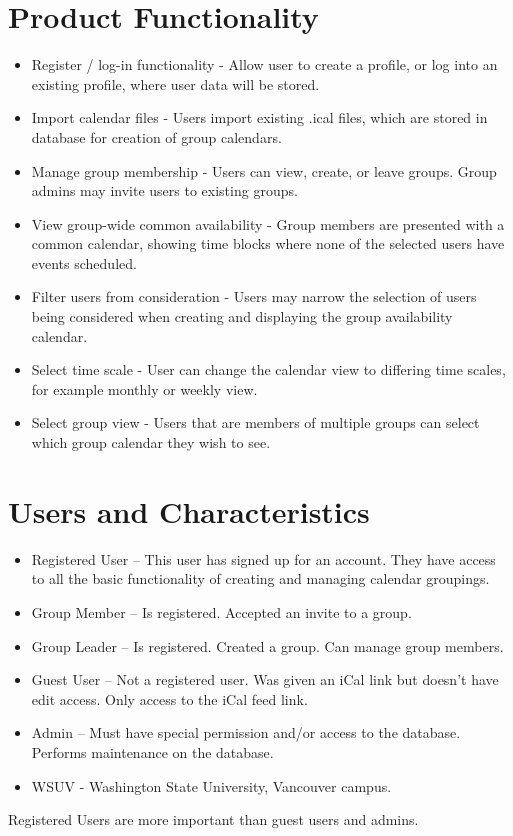 \documentclass{scrreprt}
\begin{document}
\section{Product Functionality}
\begin{itemize}
\item Register / log-in functionality - Allow user to create a profile, or log
into an existing profile, where user data will be stored.
\item Import calendar files - Users import existing .ical files, which are
stored in database for creation of group calendars.
\item Manage group membership - Users can view, create, or leave groups. Group
admins may invite users to existing groups.
\item View group-wide common availability - Group members are presented with a
common calendar, showing time blocks where none of the selected users have
events scheduled.
\item Filter users from consideration - Users may narrow the selection of users
being considered when creating and displaying the group availability calendar.
\item Select time scale - User can change the calendar view to differing time 
scales, for example monthly or weekly view.
\item Select group view - Users that are members of multiple groups can select
which group calendar they wish to see.
\end{itemize}

\section{Users and Characteristics}
\begin{itemize}
    \item Registered User – This user has signed up for an account. They have access to
all the basic functionality of creating and managing calendar groupings.
    \item Group Member – Is registered. Accepted an invite to a group.
    \item Group Leader – Is registered. Created a group. Can manage group members.
    \item Guest User – Not a registered user. Was given an iCal link but doesn’t have edit
access. Only access to the iCal feed link.
    \item Admin – Must have special permission and/or access to the database. Performs
maintenance on the database.
	\item WSUV - Washington State University, Vancouver campus.
\end{itemize}
Registered Users are more important than guest users and admins.
\end{document}
